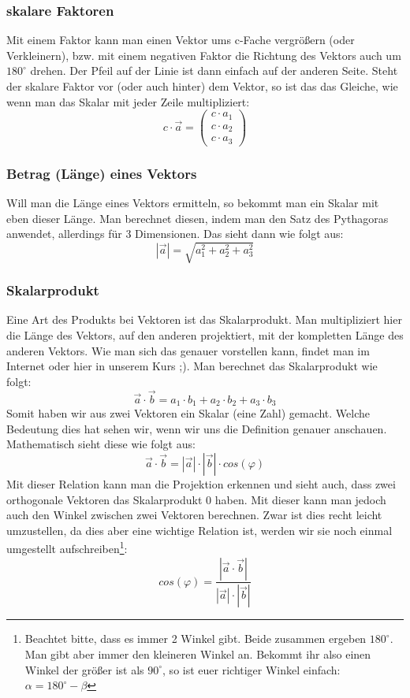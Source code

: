 \subsubsection{skalare Faktoren}
Mit einem Faktor kann man einen Vektor ums c-Fache vergrößern (oder Verkleinern), bzw. mit einem negativen Faktor die Richtung des Vektors auch um \(180^{\circ}\) drehen. Der Pfeil auf der Linie ist dann einfach auf der anderen Seite. Steht der skalare Faktor vor (oder auch hinter) dem Vektor, so ist das das Gleiche, wie wenn man das Skalar mit jeder Zeile multipliziert:
\[c\cdot \vec{a}=
\begin{pmatrix}
 c\cdot a_1\\
 c\cdot a_2\\
 c\cdot a_3
\end{pmatrix}
\]
\subsubsection{Betrag (Länge) eines Vektors}
Will man die Länge eines Vektors ermitteln, so bekommt man ein Skalar mit eben dieser Länge. Man berechnet diesen, indem man den Satz des Pythagoras anwendet, allerdings für 3 Dimensionen. Das sieht dann wie folgt aus:
\[|\vec{a}|=\sqrt{a_1^2+a_2^2+a_3^2}\]
\subsubsection{Skalarprodukt}
Eine Art des Produkts bei Vektoren ist das Skalarprodukt. Man multipliziert hier die Länge des Vektors, auf den anderen projektiert, mit der kompletten Länge des anderen Vektors. Wie man sich das genauer vorstellen kann, findet man im Internet oder hier in unserem Kurs ;). Man berechnet das Skalarprodukt wie folgt:
\[\vec{a}\cdot \vec{b}=a_1\cdot b_1+a_2\cdot b_2+a_3\cdot b_3\]
Somit haben wir aus zwei Vektoren ein Skalar (eine Zahl) gemacht. Welche Bedeutung dies hat sehen wir, wenn wir uns die Definition genauer anschauen. Mathematisch sieht diese wie folgt aus:
\[\vec{a}\cdot \vec{b}=|\vec{a}|\cdot |\vec{b}|\cdot cos(\varphi)\]
Mit dieser Relation kann man die Projektion erkennen und sieht auch, dass zwei orthogonale Vektoren das Skalarprodukt 0 haben. Mit dieser kann man jedoch auch den Winkel zwischen zwei Vektoren berechnen. Zwar ist dies recht leicht umzustellen, da dies aber eine wichtige Relation ist, werden wir sie noch einmal umgestellt aufschreiben\footnote{Beachtet bitte, dass es immer 2 Winkel gibt. Beide zusammen ergeben \(180^{\circ}\). Man gibt aber immer den kleineren Winkel an. Bekommt ihr also einen Winkel der größer ist als \(90^{\circ}\), so ist euer richtiger Winkel einfach: \(\alpha=180^{\circ}-\beta\)}:
\[cos(\varphi)=\frac{ | \vec{a}\cdot \vec{b} | }{|\vec{a}|\cdot |\vec{b}|}\]
